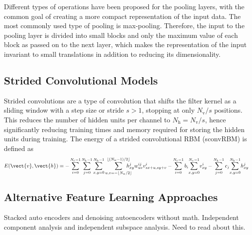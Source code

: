 Different types of operations \citep{scherer2010} have been
proposed for the pooling layers, with the common goal of creating a more compact
representation of the input data. The most commonly used type of pooling is
max-pooling. Therefore, the input to the pooling layer is divided into small
blocks and only the maximum value of each block as passed on to the next layer,
which makes the representation of the input invariant to small
translations in addition to reducing its dimensionality.

\subsection{Strided Convolutional Models}


Strided convolutions are a type of convolution that shifts the filter kernel as
a sliding window with a step size or stride $s > 1$, stopping at only $N_\text{v}
/ s$ positions. This reduces the number of hidden units per channel to
$N_\text{h} = N_\text{v} / s$, hence significantly reducing training times and
memory required for storing the hidden units during training. The energy of a
strided convolutional RBM (sconvRBM) is defined as
\begin{equation} 
E(\vect{v},\vect{h}) = 
-\sum_{i=0}^{N_\text{c}-1}\sum_{j=0}^{N_\text{k}-1}\sum_{x,y=0}^{N_\text{h}-1}
\sum_{u,v=-\lfloor N_\text{w}/2\rfloor}^{\lfloor(N_\text{w}-1)/2\rfloor}
\hspace{-1.2em}h_{xy}^jw_{uv}^{ij}v_{sx+u, sy + v}^i -
\sum_{i=0}^{N_\text{c}-1}b_i\!\sum_{x,y = 0}^{N_\text{v}-1}\!v_{xy}^i -
\sum_{j=0}^{N_\text{k}-1}c_j\!\sum_{x,y = 0}^{N_\text{h}-1}\!h_{xy}^j
\end{equation}  

\subsection{Alternative Feature Learning Approaches}

Stacked auto encoders and denoising autoencoders without math. Independent
component analysis and independent subspace analysis. Need to read about this.

